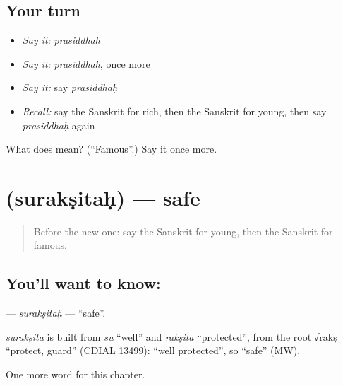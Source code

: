 \subsection*{Your turn}
\begin{itemize}
\raggedright
  \item \emph{Say it:} \emph{prasiddhaḥ}
  \item \emph{Say it:} \emph{prasiddhaḥ}, once more
  \item \emph{Say it:} say \emph{prasiddhaḥ}
  \item \emph{Recall:} say the Sanskrit for rich, then the Sanskrit for young, then say \emph{prasiddhaḥ} again
\end{itemize}

\begin{tcolorbox}[breakable,colback=teal!4,colframe=teal!35!black,title={Before you move on}]
What does  mean? (\textquotedblleft{}Famous\textquotedblright{}.) Say it once more.
\end{tcolorbox}
\section[\texorpdfstring{\sk{सुरक्षितः} (surakṣitaḥ)}{सुरक्षितः (surakṣitaḥ)}]{ (surakṣitaḥ) — safe}

\label{lesson:SA-C127-suraksitah}



\begin{quote}
Before the new one: say the Sanskrit for young, then the Sanskrit for famous.
\end{quote}

\subsection*{You'll want to know: }
\textbf{} — \emph{surakṣitaḥ} — \textquotedblleft{}safe\textquotedblright{}.

\begin{cousinweb}
\emph{surakṣita} is built from \emph{su} \textquotedblleft{}well\textquotedblright{} and \emph{rakṣita} \textquotedblleft{}protected\textquotedblright{}, from the root √rakṣ \textquotedblleft{}protect, guard\textquotedblright{} (CDIAL 13499): \textquotedblleft{}well protected\textquotedblright{}, so \textquotedblleft{}safe\textquotedblright{} (MW).
\end{cousinweb}

\begin{grammarlens}[title={What you've built}]
One more word for this chapter.
\end{grammarlens}

